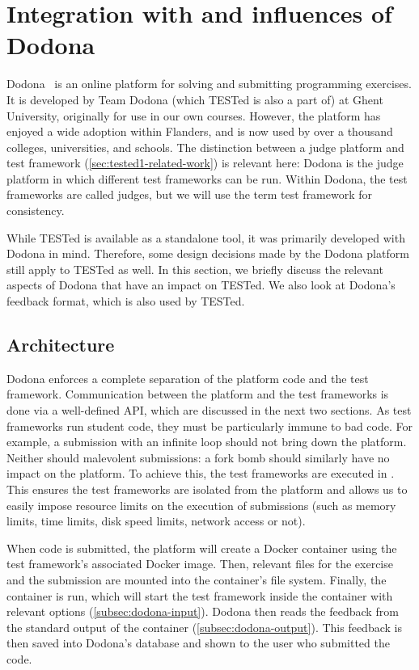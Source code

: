 \documentclass[../main]{subfiles}
\begin{document}
\section{Integration with and influences of Dodona}\label{sec:tested-and-dodona}

Dodona~\autocite{vanpetegemDodonaLearnCode2023} is an online platform for solving and submitting programming exercises.
It is developed by Team Dodona (which TESTed is also a part of) at Ghent University, originally for use in our own courses.
However, the platform has enjoyed a wide adoption within Flanders, and is now used by over a thousand colleges, universities, and schools.
The distinction between a judge platform and test framework (\vref{sec:tested1-related-work}) is relevant here: Dodona is the judge platform in which different test frameworks can be run.
Within Dodona, the test frameworks are called judges, but we will use the term test framework for consistency.

While TESTed is available as a standalone tool, it was primarily developed with Dodona in mind.
Therefore, some design decisions made by the Dodona platform still apply to TESTed as well.
In this section, we briefly discuss the relevant aspects of Dodona that have an impact on TESTed.
We also look at Dodona's feedback format, which is also used by TESTed.

\subsection{Architecture}\label{subsec:dodona-architecture}

Dodona enforces a complete separation of the platform code and the test framework.
Communication between the platform and the test frameworks is done via a well-defined API, which are discussed in the next two sections.
As test frameworks run student code, they must be particularly immune to bad code.
For example, a submission with an infinite loop should not bring down the platform.
Neither should malevolent submissions: a fork bomb should similarly have no impact on the platform.
To achieve this, the test frameworks are executed in .
This ensures the test frameworks are isolated from the platform and allows us to easily impose resource limits on the execution of submissions (such as memory limits, time limits, disk speed limits, network access or not).

When code is submitted, the platform will create a Docker container using the test framework's associated Docker image.
Then, relevant files for the exercise and the submission are mounted into the container's file system.
Finally, the container is run, which will start the test framework inside the container with relevant options (\cref{subsec:dodona-input}).
Dodona then reads the feedback from the standard output of the container (\cref{subsec:dodona-output}).
This feedback is then saved into Dodona's database and shown to the user who submitted the code.
\end{document}
